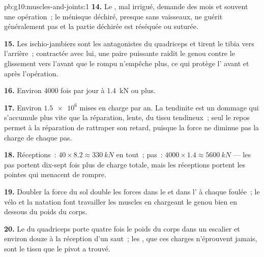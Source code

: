\begin{solution}{pb:g10:muscles-and-joints:1}
\textbf{14.} Le , mal irrigué, demande des mois et souvent une
opération~; le ménisque déchiré,  presque sans vaisseaux, ne
guérit généralement pas et la partie déchirée est réséquée ou suturée.

\textbf{15.} Les ischio-jambiers sont les antagonistes du quadriceps et
tirent le tibia vers l'arrière~; contractée avec lui, une paire
puissante raidit le genou contre le glissement vers l'avant que le
 rompu n'empêche plus, ce qui protège l' avant et
après l'opération.

\textbf{16.} Environ 4000 fois par jour à \qty{1.4}{kN} ou plus.

\textbf{17.} Environ $\num{1.5e6}$ mises en charge par an. La tendinite
est un dommage qui s'accumule plus vite que la réparation, lente, du
tissu tendineux~; seul le repos permet à la réparation de rattraper son
retard, puisque la force ne diminue pas la charge de chaque pas.

\textbf{18.} Réceptions~: $40 \times 8.2 \approx \qty{330}{kN}$ en
tout~; pas~: $4000 \times 1.4 \approx \qty{5600}{kN}$ --- les pas
portent dix-sept fois plus de charge totale, mais les réceptions
portent les pointes qui menacent de rompre.

\textbf{19.} Doubler la force du sol double les forces dans le 
et dans l' à chaque foulée~; le vélo et la natation font
travailler les muscles en chargeant le genou bien en dessous du poids
du corps.

\textbf{20.} Le  du quadriceps porte quatre fois le poids du
corps dans un escalier et environ douze à la réception d'un saut~; les
, que ces charges n'éprouvent jamais, sont le tissu que le
pivot a trouvé.
\end{solution}
